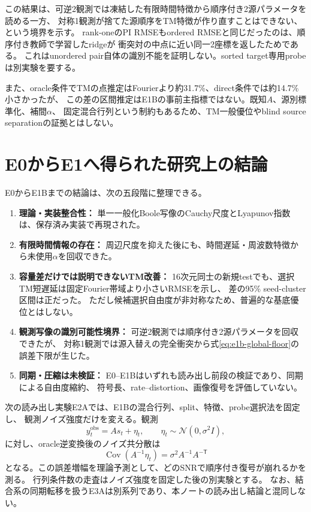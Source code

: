 \documentclass[a4paper,11pt]{jlreq}
\begin{document}
この結果は、可逆2観測では凍結した有限時間特徴から順序付き2源パラメータを読める一方、
対称1観測が捨てた源順序をTM特徴が作り直すことはできない、という境界を示す。
rank-oneのPI RMSEもordered RMSEと同じだったのは、順序付き教師で学習したridgeが
衝突対の中点に近い同一2座標を返したためである。
これはunordered pair自体の識別不能を証明しない。sorted target専用probeは別実験を要する。

また、oracle条件でTMの点推定はFourierより約31.7\%、direct条件では約14.7\%小さかったが、
この差の区間推定はE1Bの事前主指標ではない。既知$A$、源別標準化、補間$\alpha$、
固定混合行列という制約もあるため、TM一般優位やblind source separationの証拠とはしない。

\section{E0からE1へ得られた研究上の結論}

E0からE1Bまでの結論は、次の五段階に整理できる。

\begin{enumerate}
    \item \textbf{理論・実装整合性：}
    単一一般化Boole写像のCauchy尺度とLyapunov指数は、保存済み実装で再現された。
    \item \textbf{有限時間情報の存在：}
    周辺尺度を抑えた後にも、時間遅延・周波数特徴から未使用$\alpha$を回収できた。
    \item \textbf{容量差だけでは説明できないTM改善：}
    16次元同士の新規testでも、選択TM短遅延は固定Fourier帯域より小さいRMSEを示し、
    差の95\% seed-cluster区間は正だった。
    ただし候補選択自由度が非対称なため、普遍的な基底優位とはしない。
    \item \textbf{観測写像の識別可能性境界：}
    可逆2観測では順序付き2源パラメータを回収できたが、
    対称1観測では源入替えの完全衝突から式\eqref{eq:e1b-global-floor}の誤差下限が生じた。
    \item \textbf{同期・圧縮は未検証：}
    E0--E1Bはいずれも読み出し前段の検証であり、同期による自由度縮約、
    符号長、rate--distortion、画像復号を評価していない。
\end{enumerate}

次の読み出し実験E2Aでは、E1Bの混合行列、split、特徴、probe選択法を固定し、
観測ノイズ強度だけを変える。観測
\begin{equation}
    y_t^{\mathrm{obs}}=A s_t+\eta_t,
    \qquad
    \eta_t\sim\mathcal N(0,\sigma^2 I),
\end{equation}
に対し、oracle逆変換後のノイズ共分散は
\begin{equation}
    \operatorname{Cov}(A^{-1}\eta_t)
    =\sigma^2 A^{-1}A^{-\mathsf T}
\end{equation}
となる。この誤差増幅を理論予測として、どのSNRで順序付き復号が崩れるかを測る。
行列条件数の走査はノイズ強度を固定した後の別実験とする。
なお、結合系の同期転移を扱うE3Aは別系列であり、本ノートの読み出し結論と混同しない。
\end{document}
